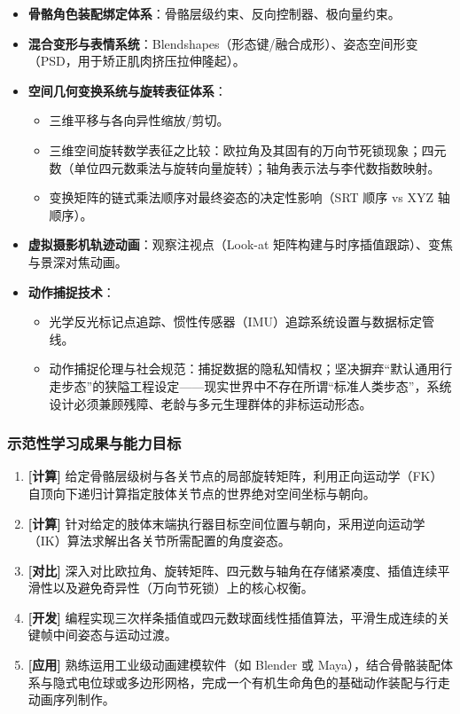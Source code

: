 \begin{itemize}
    \begin{itemize}
        \item 蒙皮权重分配与顶点绑定。
        \item 线性混合蒙皮 (LBS)及其固有的关节点“糖果纸包装扭曲”与体积丢失缺陷。
        \item 双四元数蒙皮 (DQS)在刚性体积保持上的数学优势。
    \end{itemize}
    \item \textbf{骨骼角色装配绑定体系}：骨骼层级约束、反向控制器、极向量约束。
    \item \textbf{混合变形与表情系统}：Blendshapes（形态键/融合成形）、姿态空间形变（PSD，用于矫正肌肉挤压拉伸隆起）。
    \item \textbf{空间几何变换系统与旋转表征体系}：
    \begin{itemize}
        \item 三维平移与各向异性缩放/剪切。
        \item 三维空间旋转数学表征之比较：欧拉角及其固有的万向节死锁现象；四元数（单位四元数乘法与旋转向量旋转）；轴角表示法与李代数指数映射。
        \item 变换矩阵的链式乘法顺序对最终姿态的决定性影响（SRT 顺序 vs XYZ 轴顺序）。
    \end{itemize}
    \item \textbf{虚拟摄影机轨迹动画}：观察注视点（Look-at 矩阵构建与时序插值跟踪）、变焦与景深对焦动画。
    \item \textbf{动作捕捉技术}：
    \begin{itemize}
        \item 光学反光标记点追踪、惯性传感器（IMU）追踪系统设置与数据标定管线。
        \item 动作捕捉伦理与社会规范：捕捉数据的隐私知情权；坚决摒弃“默认通用行走步态”的狭隘工程设定——现实世界中不存在所谓“标准人类步态”，系统设计必须兼顾残障、老龄与多元生理群体的非标运动形态。
    \end{itemize}
\end{itemize}

\subsubsection{示范性学习成果与能力目标}
\begin{enumerate}
    \item \textbf{[计算]} 给定骨骼层级树与各关节点的局部旋转矩阵，利用正向运动学（FK）自顶向下递归计算指定肢体关节点的世界绝对空间坐标与朝向。
    \item \textbf{[计算]} 针对给定的肢体末端执行器目标空间位置与朝向，采用逆向运动学（IK）算法求解出各关节所需配置的角度姿态。
    \item \textbf{[对比]} 深入对比欧拉角、旋转矩阵、四元数与轴角在存储紧凑度、插值连续平滑性以及避免奇异性（万向节死锁）上的核心权衡。
    \item \textbf{[开发]} 编程实现三次样条插值或四元数球面线性插值算法，平滑生成连续的关键帧中间姿态与运动过渡。
    \item \textbf{[应用]} 熟练运用工业级动画建模软件（如 Blender 或 Maya），结合骨骼装配体系与隐式电位球或多边形网格，完成一个有机生命角色的基础动作装配与行走动画序列制作。
\end{enumerate}

